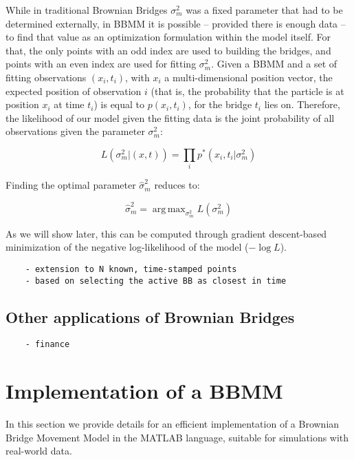 \documentclass{article}
\DeclareMathOperator*{\argmax}{arg\,max}
\begin{document}
While in traditional Brownian Bridges $\sigma_m^2$ was a fixed parameter that had to be determined externally, in BBMM it is possible -- provided there is enough data -- to find that value as an optimization formulation within the model itself. For that, the only points with an odd index are used to building the bridges, and points with an even index are used for fitting $\sigma_m^2$. Given a BBMM and a set of fitting observations $(x_i,t_i)$, with $x_i$ a multi-dimensional position vector, the expected position of observation $i$ (that is, the probability that the particle is at position $x_i$ at time $t_i$) is equal to $p(x_i,t_i)$, for the bridge $t_i$ lies on. Therefore, the likelihood of our model given the fitting data is the joint probability of all observations given the parameter $\sigma_m^2$:

\[ L(\sigma_m^2 | (x,t)) = \prod_i p^*(x_i,t_i|\sigma_m^2) \]

Finding the optimal parameter $\hat{\sigma}_m^2$ reduces to:

\[ \hat{\sigma}_m^2 = \argmax_{\sigma_m^2} L(\sigma_m^2) \]

As we will show later, this can be computed through gradient descent-based minimization of the negative log-likelihood of the model ($-\log L$).

\begin{verbatim}
    - extension to N known, time-stamped points
    - based on selecting the active BB as closest in time
\end{verbatim}

\subsection{Other applications of Brownian Bridges}

\begin{verbatim}
    - finance
\end{verbatim}

\section{Implementation of a BBMM}

In this section we provide details for an efficient implementation of a Brownian Bridge Movement Model in the MATLAB language, suitable for simulations with real-world data.
\end{document}
